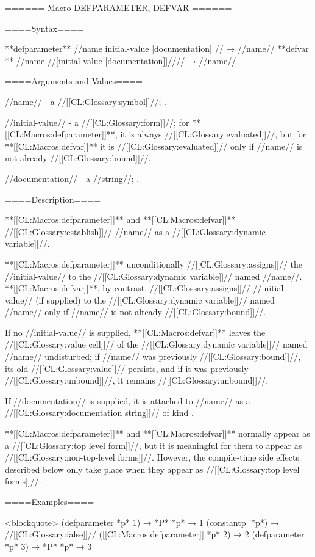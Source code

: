 ====== Macro DEFPARAMETER, DEFVAR ======

====Syntax====

**defparameter** //name initial-value [documentation] // → //name// **defvar ** //name //[initial-value [documentation]]//// → //name//

====Arguments and Values====

//name// - a //[[CL:Glossary:symbol]]//; \noeval.

//initial-value// - a //[[CL:Glossary:form]]//; for **[[CL:Macros:defparameter]]**, it is always //[[CL:Glossary:evaluated]]//, but for **[[CL:Macros:defvar]]** it is //[[CL:Glossary:evaluated]]// only if //name// is not already //[[CL:Glossary:bound]]//.

//documentation// - a //string//; \noeval.

====Description====

**[[CL:Macros:defparameter]]** and **[[CL:Macros:defvar]]** //[[CL:Glossary:establish]]// //name// as a //[[CL:Glossary:dynamic variable]]//.

**[[CL:Macros:defparameter]]** unconditionally //[[CL:Glossary:assigns]]// the //initial-value// to the //[[CL:Glossary:dynamic variable]]// named //name//. **[[CL:Macros:defvar]]**, by contrast, //[[CL:Glossary:assigns]]// //initial-value// (if supplied) to the //[[CL:Glossary:dynamic variable]]// named //name// only if //name// is not already //[[CL:Glossary:bound]]//.

If no //initial-value// is supplied, **[[CL:Macros:defvar]]** leaves the //[[CL:Glossary:value cell]]// of the //[[CL:Glossary:dynamic variable]]// named //name// undisturbed; if //name// was previously //[[CL:Glossary:bound]]//, its old //[[CL:Glossary:value]]// persists, and if it was previously //[[CL:Glossary:unbound]]//, it remains //[[CL:Glossary:unbound]]//.

If //documentation// is supplied, it is attached to //name// as a //[[CL:Glossary:documentation string]]// of kind .

**[[CL:Macros:defparameter]]** and **[[CL:Macros:defvar]]** normally appear as a //[[CL:Glossary:top level form]]//, but it is meaningful for them to appear as //[[CL:Glossary:non-top-level forms]]//. However, the compile-time side effects described below only take place when they appear as //[[CL:Glossary:top level forms]]//.

====Examples====

<blockquote> (defparameter *p* 1) → *P* *p* → 1 (constantp '*p*) → //[[CL:Glossary:false]]// ([[CL:Macros:defparameter]] *p* 2) → 2 (defparameter *p* 3) → *P* *p* → 3

